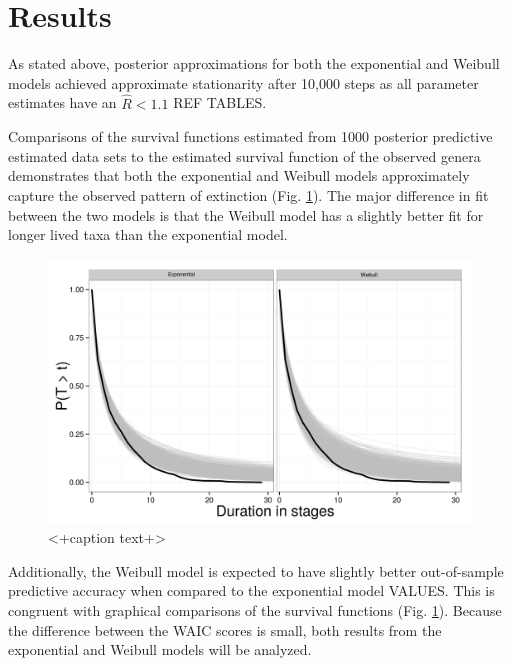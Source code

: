 \documentclass[12pt,letterpaper]{article}
\begin{document}
\section{Results}

As stated above, posterior approximations for both the exponential and Weibull models achieved approximate stationarity after 10,000 steps as all parameter estimates have an \(\hat{R} < 1.1\) \uppercase{ref tables}. 

Comparisons of the survival functions estimated from 1000 posterior predictive estimated data sets to the estimated survival function of the observed genera demonstrates that both the exponential and Weibull models approximately capture the observed pattern of extinction (Fig. \ref{fig:surv}). The major difference in fit between the two models is that the Weibull model has a slightly better fit for longer lived taxa than the exponential model.

\begin{figure}[ht]
  \centering
  \includegraphics[height = 0.5\textheight,width=\textwidth,keepaspectratio=true]{figure/survival_curves}
  \caption{<+caption text+>}
  \label{fig:surv}
\end{figure}


Additionally, the Weibull model is expected to have slightly better out-of-sample predictive accuracy when compared to the exponential model \uppercase{values}. This is congruent with graphical comparisons of the survival functions (Fig. \ref{fig:surv}). Because the difference between the WAIC scores is small, both results from the exponential and Weibull models will be analyzed.
\end{document}

